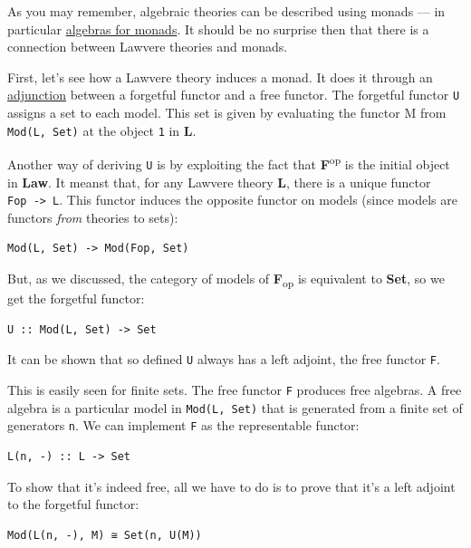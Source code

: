As you may remember, algebraic theories can be described using monads
--- in particular
\href{https://bartoszmilewski.com/2017/03/14/algebras-for-monads/}{algebras
for monads}. It should be no surprise then that there is a connection
between Lawvere theories and monads.

First, let's see how a Lawvere theory induces a monad. It does it
through an
\href{https://bartoszmilewski.com/2016/06/15/freeforgetful-adjunctions/}{adjunction}
between a forgetful functor and a free functor. The forgetful functor
\texttt{U} assigns a set to each model. This set is given by evaluating
the functor M from \texttt{Mod(L,\ Set)} at the object \texttt{1} in
\textbf{L}.

Another way of deriving \texttt{U} is by exploiting the fact that
\textbf{F}\textsuperscript{op} is the initial object in \textbf{Law}. It
meanst that, for any Lawvere theory \textbf{L}, there is a unique
functor \texttt{Fop\ -\textgreater{}\ L}. This functor induces the
opposite functor on models (since models are functors \emph{from}
theories to sets):

\begin{verbatim}
Mod(L, Set) -> Mod(Fop, Set)
\end{verbatim}

But, as we discussed, the category of models of
\textbf{F}\textsubscript{op} is equivalent to \textbf{Set}, so we get
the forgetful functor:

\begin{verbatim}
U :: Mod(L, Set) -> Set
\end{verbatim}

It can be shown that so defined \texttt{U} always has a left adjoint,
the free functor \texttt{F}.

This is easily seen for finite sets. The free functor \texttt{F}
produces free algebras. A free algebra is a particular model in
\texttt{Mod(L,\ Set)} that is generated from a finite set of generators
\texttt{n}. We can implement \texttt{F} as the representable functor:

\begin{verbatim}
L(n, -) :: L -> Set
\end{verbatim}

To show that it's indeed free, all we have to do is to prove that it's a
left adjoint to the forgetful functor:

\begin{verbatim}
Mod(L(n, -), M) ≅ Set(n, U(M))
\end{verbatim}

